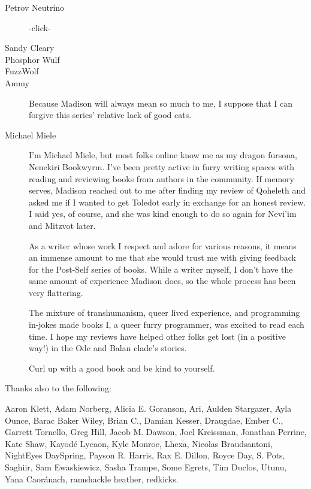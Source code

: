 \begin{description}
  \item[Petrov Neutrino]
  -click-

  \item[Sandy Cleary]
  
  \item[Phosphor Wulf]

  \item[FuzzWolf]

  \item[Ammy]
  Because Madison will always mean so much to me, I suppose that I can forgive this series' relative lack of good cats.

  \item[Michael Miele]
  I'm Michael Miele, but most folks online know me as my dragon fursona, Nenekiri Bookwyrm. I've been pretty active in furry writing spaces with reading and reviewing books from authors in the community. If memory serves, Madison reached out to me after finding my review of Qoheleth and asked me if I wanted to get Toledot early in exchange for an honest review. I said yes, of course, and she was kind enough to do so again for Nevi'im and Mitzvot later.

  As a writer whose work I respect and adore for various reasons, it means an immense amount to me that she would trust me with giving feedback for the Post-Self series of books. While a writer myself, I don’t have the same amount of experience Madison does, so the whole process has been very flattering.

  The mixture of transhumanism, queer lived experience, and programming in-jokes made books I, a queer furry programmer, was excited to read each time. I hope my reviews have helped other folks get lost (in a positive way!) in the Ode and Balan clade's stories.

  Curl up with a good book and be kind to yourself.
\end{description}

Thanks also to the following:

Aaron Klett,
Adam Norberg,
Alicia E. Goranson,
Ari,
Aulden Stargazer,
Ayla Ounce,
Barac Baker Wiley,
Brian C.,
Damian Kesser,
Draugdae,
Ember C.,
Garrett Tornello,
Greg Hill,
Jacob M. Dawson,
Joel Kreissman,
Jonathan Perrine,
Kate Shaw,
Kayodé Lycaon,
Kyle Monroe,
Lhexa,
Nicolas Braudsantoni,
NightEyes DaySpring,
Payson R. Harris,
Rax E. Dillon,
Royce Day,
S. Pots,
Saghiir,
Sam Ewaskiewicz,
Sasha Trampe,
Some Egrets,
Tim Duclos,
Utunu,
Yana Caoránach,
ramshackle heather,
redkicks.

